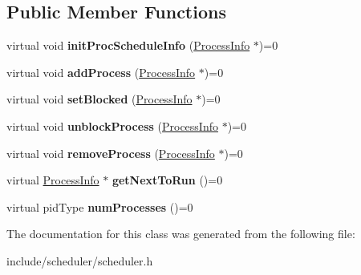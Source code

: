 \subsection*{\-Public \-Member \-Functions}
\begin{DoxyCompactItemize}
\item 
\hypertarget{classcScheduler_abb86834353cf48c1b2b851232ce8615b}{virtual void {\bfseries init\-Proc\-Schedule\-Info} (\hyperlink{structProcessInfo}{\-Process\-Info} $\ast$)=0}\label{d0/d21/classcScheduler_abb86834353cf48c1b2b851232ce8615b}

\item 
\hypertarget{classcScheduler_a5a73902cf4b49b4ec39d46edfe8d8806}{virtual void {\bfseries add\-Process} (\hyperlink{structProcessInfo}{\-Process\-Info} $\ast$)=0}\label{d0/d21/classcScheduler_a5a73902cf4b49b4ec39d46edfe8d8806}

\item 
\hypertarget{classcScheduler_ab82ffc2909aae9047dd66c28c609abe7}{virtual void {\bfseries set\-Blocked} (\hyperlink{structProcessInfo}{\-Process\-Info} $\ast$)=0}\label{d0/d21/classcScheduler_ab82ffc2909aae9047dd66c28c609abe7}

\item 
\hypertarget{classcScheduler_aa6e5255fc377bf27707b5958a9252eaf}{virtual void {\bfseries unblock\-Process} (\hyperlink{structProcessInfo}{\-Process\-Info} $\ast$)=0}\label{d0/d21/classcScheduler_aa6e5255fc377bf27707b5958a9252eaf}

\item 
\hypertarget{classcScheduler_a16978dd9cebeba3e6d37f0a28a246f96}{virtual void {\bfseries remove\-Process} (\hyperlink{structProcessInfo}{\-Process\-Info} $\ast$)=0}\label{d0/d21/classcScheduler_a16978dd9cebeba3e6d37f0a28a246f96}

\item 
\hypertarget{classcScheduler_a34d6d4e823b8b1731638f0de9e084a17}{virtual \hyperlink{structProcessInfo}{\-Process\-Info} $\ast$ {\bfseries get\-Next\-To\-Run} ()=0}\label{d0/d21/classcScheduler_a34d6d4e823b8b1731638f0de9e084a17}

\item 
\hypertarget{classcScheduler_a64106a7e965d14f7183960cf7f35200d}{virtual pid\-Type {\bfseries num\-Processes} ()=0}\label{d0/d21/classcScheduler_a64106a7e965d14f7183960cf7f35200d}

\end{DoxyCompactItemize}


\-The documentation for this class was generated from the following file\-:\begin{DoxyCompactItemize}
\item 
include/scheduler/scheduler.\-h\end{DoxyCompactItemize}
